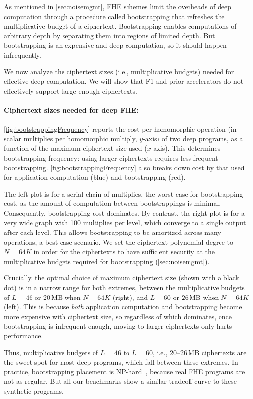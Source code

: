 As mentioned in \autoref{sec:noisemgmt}, FHE schemes
limit the overheads of deep computation through a procedure called
bootstrapping that refreshes the multiplicative budget of a ciphertext.
Bootstrapping enables computations of arbitrary depth by separating them into
regions of limited depth. But bootstrapping is an expensive and deep
computation, so it should happen infrequently.

We now analyze the ciphertext sizes (i.e., multiplicative budgets) needed for
effective deep computation. We will show that F1 and prior accelerators do not
effectively support large enough ciphertexts.

\paragraph{Ciphertext sizes needed for deep FHE:}
\autoref{fig:bootstrappingFrequency} reports the cost per homomorphic operation
(in scalar multiplies per homomorphic multiply, $y$-axis) of two deep programs,
as a function of the maximum ciphertext size used ($x$-axis). This determines
bootstrapping frequency: using larger ciphertexts requires less frequent
bootstrapping. \autoref{fig:bootstrappingFrequency} also breaks down cost by
that used for application computation (blue) and bootstrapping (red).

The left plot is for a serial chain of multiplies, the worst case for
bootstrapping cost, as the amount of computation between bootstrappings is
minimal. Consequently, bootstrapping cost dominates. By contrast, the right
plot is for a very wide graph with 100 multiplies per level, which converge to
a single output after each level. This allows bootstrapping to be amortized
across many operations, a best-case scenario. We set the ciphertext polynomial degree
to $N=64K$ in order for the ciphertexts to have sufficient security at the
multiplicative budgets required for bootstrapping (\autoref{sec:noisemgmt}).

Crucially, the optimal choice of maximum ciphertext size (shown with a black
dot) is in a narrow range for both extremes, between the multiplicative budgets
of $L=46$ or 20\,MB when $N=64K$ (right), and $L=60$ or 26\,MB when $N=64K$
(left). This is because \emph{both} application computation and bootstrapping
become more expensive with ciphertext size, so regardless of which dominates,
once bootstrapping is infrequent enough, moving to larger ciphertexts only
hurts performance.

Thus, multiplicative budgets of $L=46$ to $L=60$, i.e., 20--26\,MB ciphertexts
are the sweet spot for most deep programs, which fall between these extremes.
In practice, bootstrapping placement is
NP-hard~\cite{benhamouda2017optimization}, because real FHE programs are not as
regular. But all our benchmarks show a similar tradeoff curve to these
synthetic programs.

